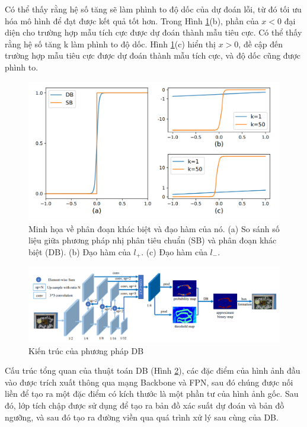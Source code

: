Có thể thấy rằng hệ số tăng sẽ làm phình to độ dốc của dự đoán lỗi, từ đó tối ưu hóa mô hình để đạt được kết quả tốt hơn. Trong Hình \ref{fig11}(b), phần của $x < 0$ đại diện cho trường hợp mẫu tích cực được dự đoán thành mẫu tiêu cực. Có thể thấy rằng hệ số tăng k làm phình to độ dốc. Hình \ref{fig11}(c) hiển thị $x > 0$, đề cập đến trường hợp mẫu tiêu cực được dự đoán thành mẫu tích cực, và độ dốc cũng được phình to.

\begin{figure}[h]
    \includegraphics[scale=0.5]{images/derivative-DB.png}
    \centering
    \caption{Minh họa về phân đoạn khác biệt và đạo hàm của nó. (a) So sánh số liệu giữa phương pháp nhị phân tiêu chuẩn (SB) và phân đoạn khác biệt (DB). (b) Đạo hàm của $l_+$. (c) Đạo hàm của $l_-$. \cite{liao2019realtime}}
    \label{fig11}
\end{figure}

\begin{figure}[h]
    \includegraphics[scale=0.45]{images/architecture-db.png}
    \centering
    \caption{Kiến trúc của phương pháp DB}
    \label{fig12}
\end{figure}

Cấu trúc tổng quan của thuật toán DB (Hình \ref{fig12}), các đặc điểm của hình ảnh đầu vào được trích xuất thông qua mạng Backbone và FPN, sau đó chúng được nối liền để tạo ra một đặc điểm có kích thước là một phần tư của hình ảnh gốc. Sau đó, lớp tích chập được sử dụng để tạo ra bản đồ xác suất dự đoán và bản đồ ngưỡng, và sau đó tạo ra đường viền qua quá trình xử lý sau cùng của DB.

